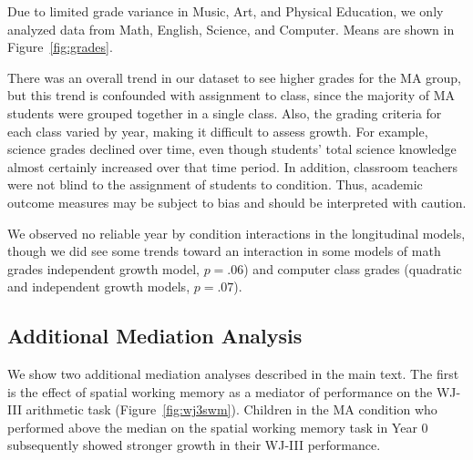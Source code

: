 \documentclass[11pt]{article}
\begin{document}
Due to limited grade variance in Music, Art, and Physical Education, we only analyzed data from Math, English, Science, and Computer. Means are shown in Figure~\ref{fig:grades}.

There was an overall trend in our dataset to see higher grades for the MA group, but this trend is confounded with assignment to class, since the majority of MA students were grouped together in a single class. Also, the grading criteria for each class varied by year, making it difficult to assess growth. For example, science grades declined over time, even though students' total science knowledge almost certainly increased over that time period. In addition, classroom teachers were not blind to the assignment of students to condition. Thus, academic outcome measures may be subject to bias and should be interpreted with caution.

We observed no reliable year by condition interactions in the longitudinal models, though we did see some trends toward an interaction in some models of math grades independent growth model, $p = .06$) and computer class grades (quadratic and independent growth models, $p = .07$).




\subsection{Additional Mediation Analysis}

We show two additional mediation analyses described in the main text. The first is the effect of spatial working memory as a mediator of performance on the WJ-III arithmetic task (Figure~\ref{fig:wj3swm}). Children in the MA condition who performed above the median on the spatial working memory task in Year 0 subsequently showed stronger growth in their WJ-III performance.
\end{document}

